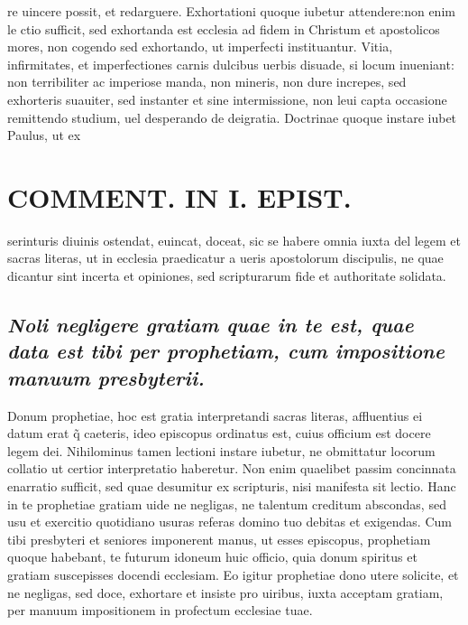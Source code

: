 \documentclass{article}
\begin{document}
\begin{pages}
re uincere possit, et redarguere. Exhortationi quoque iubetur attendere:non enim le ctio sufficit, sed exhortanda est ecclesia ad fidem in Christum et apostolicos mores, non cogendo sed exhortando, ut imperfecti instituantur. Vitia, infirmitates, et imperfectiones carnis dulcibus uerbis disuade, si locum inueniant: non terribiliter ac imperiose manda, non mineris, non dure increpes, sed exhorteris suauiter, sed instanter et sine intermissione, non leui capta occasione remittendo studium, uel desperando de deigratia. Doctrinae quoque instare iubet Paulus, ut ex  \pend
\section*{COMMENT. IN I. EPIST. }
\marginpar{[ p.512 ]}\pstart serinturis diuinis ostendat, euincat, doceat, sic se habere omnia iuxta del legem et sacras literas, ut in ecclesia praedicatur a ueris apostolorum discipulis, ne quae dicantur sint incerta et opiniones, sed scripturarum fide et authoritate solidata.  \pend
{}
{}
\subsection*{\textit{Noli negligere gratiam quae in te est, quae data est tibi per prophetiam, cum impositione manuum presbyterii. }}\pstart Donum prophetiae, hoc est gratia interpretandi sacras literas, affluentius ei datum erat q̃ caeteris, ideo episcopus ordinatus est, cuius officium est docere legem dei. Nihilominus tamen lectioni instare iubetur, ne obmittatur locorum collatio ut certior interpretatio haberetur. Non enim quaelibet passim concinnata enarratio sufficit, sed quae desumitur ex scripturis, nisi manifesta sit lectio. Hanc in te prophetiae gratiam uide ne negligas, ne talentum creditum abscondas, sed usu et exercitio quotidiano usuras referas domino tuo debitas et exigendas. Cum tibi presbyteri et seniores imponerent manus, ut esses episcopus, prophetiam quoque  habebant, te futurum idoneum huic officio, quia donum spiritus et gratiam suscepisses docendi ecclesiam. Eo igitur prophetiae dono utere solicite, et ne negligas, sed doce, exhortare et insiste pro uiribus, iuxta acceptam gratiam, per manuum impositionem in profectum ecclesiae tuae.  \pend
{}
{}

\end{pages}
\end{document}
